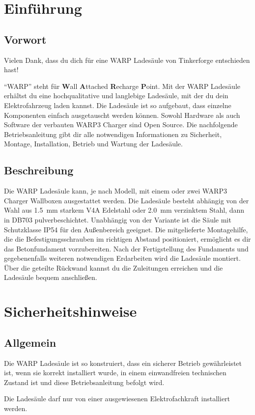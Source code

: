 \documentclass[a4paper,10pt]{article}
\newcommand{\hint}[1]{\begin{tcolorbox}[colback=boxgray,colframe=black,coltext=
white,title=Hinweis]#1\end{tcolorbox}}
\begin{document}
\begin{multicols*}{2}
	\tableofcontents \section{Einführung}
	\subsection{Vorwort} Vielen Dank, dass du
	dich für eine WARP Ladesäule von Tinkerforge entschieden hast!

	\enquote{WARP} steht
	für \textbf{W}all \textbf{A}ttached
	\textbf{R}echarge \textbf{P}oint. Mit der WARP Ladesäule
	erhältst du eine hochqualitative und langlebige Ladesäule, mit der du dein
	Elektrofahrzeug laden kannst. Die Ladesäule ist so aufgebaut, dass
	einzelne Komponenten einfach ausgetauscht werden können. Sowohl Hardware als
	auch Software der verbauten WARP3 Charger sind Open Source. Die nachfolgende Betriebsanleitung gibt dir	alle notwendigen Informationen zu Sicherheit, Montage, Installation, Betrieb
	und Wartung der Ladesäule.

	\subsection{Beschreibung}

	Die WARP Ladesäule kann, je nach Modell, mit einem oder zwei WARP3 Charger Wallboxen
	ausgestattet werden. Die Ladesäule besteht abhängig von der Wahl aus
	\SI{1.5}{\milli\meter} starkem V4A Edelstahl oder \SI{2.0}{\milli\meter}
	verzinktem Stahl, dann in DB703 pulverbeschichtet. Unabhängig von der Variante ist
	die Säule mit Schutzklasse IP54 für den
	Außenbereich geeignet. Die mitgelieferte Montagehilfe, die die Befestigungsschrauben im
	richtigen Abstand positioniert, ermöglicht es dir das Betonfundament
	vorzubereiten.
	Nach der Fertigstellung des Fundaments und gegebenenfalls weiteren
	notwendigen Erdarbeiten wird die Ladesäule montiert.
	Über die geteilte Rückwand kannst du
	die Zuleitungen erreichen und die Ladesäule bequem anschließen. 
\vspace{-0.2cm}
	\section{Sicherheitshinweise}
\vspace{-0.2cm}
	\subsection{Allgemein}
	Die WARP Ladesäule ist so konstruiert, dass ein sicherer Betrieb gewährleistet ist,
	wenn sie korrekt installiert wurde, in einem einwandfreien technischen Zustand
	ist und diese Betriebsanleitung befolgt wird. \hint{Die Ladesäule darf nur von einer ausgewiesenen Elektrofachkraft installiert
		werden.}
\vspace{-0.2cm}

\end{multicols*}
\end{document}
